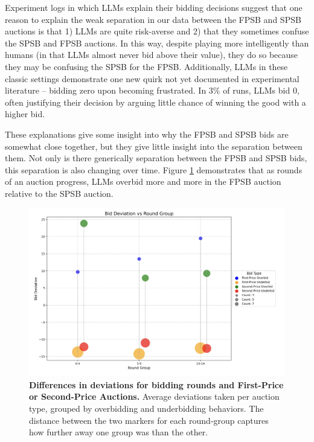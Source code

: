 \documentclass{article} %
\begin{document}
Experiment logs in which LLMs explain their bidding decisions suggest that one reason to explain the weak separation in our data between the FPSB and SPSB auctions is that 1) LLMs are quite risk-averse and 2) that they sometimes confuse the SPSB and FPSB auctions. 
In this way, despite playing more intelligently than humans (in that LLMs almost never bid above their value), they do so because they may be confusing the SPSB for the FPSB. Additionally, LLMs in these classic settings demonstrate one new quirk not yet documented in experimental literature -- bidding zero upon becoming frustrated. 
In 3\% of runs, LLMs bid $0$, often justifying their decision by arguing little chance of winning the good with a higher bid. 

These explanations give some insight into why the FPSB and SPSB bids are somewhat close together, but they give little insight into the separation between them. 
Not only is there generically separation between the FPSB and SPSB bids, this separation is also changing over time. 
Figure \ref{fig:FPSBvsSPSBbyTime} demonstrates that as rounds of an auction progress, LLMs overbid more and more in the FPSB auction relative to the SPSB auction.

\begin{figure}[h!]
    \centering 
    \hspace{2cm}\includegraphics[width=0.85\linewidth]{Figs/FP_SP_round.png}
    \caption{\textbf{ Differences in deviations for bidding rounds and First-Price or Second-Price Auctions.} Average deviations taken per auction type, grouped by overbidding and underbidding behaviors. The distance between the two markers for each round-group captures how further away one group was than the other. }
    \label{fig:FPSBvsSPSBbyTime}
\end{figure}
\end{document}
